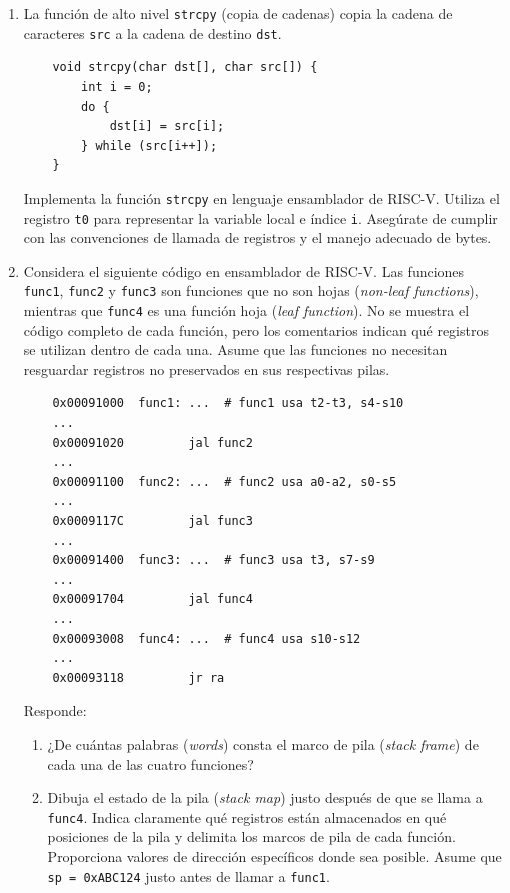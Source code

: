 \documentclass[letterpaper,12pt]{article}
\begin{document}
\begin{enumerate}
    \vspace{0.5cm}

    \item La función de alto nivel \texttt{strcpy} (copia de cadenas) copia la cadena de caracteres \texttt{src} a la cadena de destino \texttt{dst}.
    \begin{verbatim}
    void strcpy(char dst[], char src[]) {
        int i = 0;
        do {
            dst[i] = src[i];
        } while (src[i++]);
    }
    \end{verbatim}
    Implementa la función \texttt{strcpy} en lenguaje ensamblador de RISC-V. Utiliza el registro \texttt{t0} para representar la variable local e índice \texttt{i}. Asegúrate de cumplir con las convenciones de llamada de registros y el manejo adecuado de bytes.

    \vspace{0.5cm}
    \pagebreak

    \item Considera el siguiente código en ensamblador de RISC-V. Las funciones \texttt{func1}, \texttt{func2} y \texttt{func3} son funciones que no son hojas (\textit{non-leaf functions}), mientras que \texttt{func4} es una función hoja (\textit{leaf function}). No se muestra el código completo de cada función, pero los comentarios indican qué registros se utilizan dentro de cada una. Asume que las funciones no necesitan resguardar registros no preservados en sus respectivas pilas.
    
    \begin{verbatim}
    0x00091000  func1: ...  # func1 usa t2-t3, s4-s10
    ...
    0x00091020         jal func2
    ...
    0x00091100  func2: ...  # func2 usa a0-a2, s0-s5
    ...
    0x0009117C         jal func3
    ...
    0x00091400  func3: ...  # func3 usa t3, s7-s9
    ...
    0x00091704         jal func4
    ...
    0x00093008  func4: ...  # func4 usa s10-s12
    ...
    0x00093118         jr ra
    \end{verbatim}
    
    Responde:
    \begin{enumerate}[label=\alph*)]
        \item ¿De cuántas palabras (\textit{words}) consta el marco de pila (\textit{stack frame}) de cada una de las cuatro funciones?
        \item Dibuja el estado de la pila (\textit{stack map}) justo después de que se llama a \texttt{func4}. Indica claramente qué registros están almacenados en qué posiciones de la pila y delimita los marcos de pila de cada función. Proporciona valores de dirección específicos donde sea posible. Asume que \texttt{sp = 0xABC124} justo antes de llamar a \texttt{func1}.
    \end{enumerate}


\end{enumerate}
\end{document}
